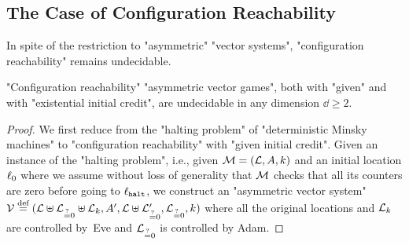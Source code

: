 \subsection{The Case of Configuration Reachability}
\label{11-sec:reach}

In spite of the restriction to "asymmetric" "vector systems",
"configuration reachability" remains undecidable.
\begin{theorem}
\label{11-th:asym-undec}
  "Configuration reachability" "asymmetric vector games", both with
  "given" and with "existential initial credit", are undecidable in
  any dimension $\dd\geq 2$.
\end{theorem}
\begin{proof}
  We first reduce from the "halting problem" of "deterministic Minsky
  machines" to "configuration reachability" with "given initial
  credit".  Given an instance of the "halting problem", i.e., given
  $\mathcal M=(\mathcal L,A,k)$ and an initial location $\ell_0$ where we
  assume without loss of generality that $\mathcal M$ checks that all its
  counters are zero before going to $\ell_\mathtt{halt}$, we construct
  an "asymmetric vector system"
  $\?V\eqdef(\Loc\uplus\Loc_{\eqby?0}\uplus\Loc_{\dd},\Act',\Loc\uplus\Loc'_{\eqby?0},\Loc_{\eqby?0},\dd)$
  where all the original locations and $\mathcal L_{k}$ are
  controlled by~Eve and $\mathcal L_{\stackrel{\!\,\!\,{{\textrm{?}}}}{=}0}$ is controlled by Adam.


\end{proof}
